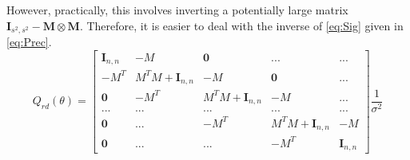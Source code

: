 \documentclass[11pt]{isuthesis}
\begin{document}
However, practically, this involves inverting a potentially large matrix $\boldsymbol{I}_{s^2,s^2}-\boldsymbol{M}\otimes\boldsymbol{M}$.  Therefore, it is easier to deal with the inverse of \eqref{eq:Sig} given in \eqref{eq:Prec}.
\begin{equation}
Q_{rd}(\theta)=
\left[
\begin{array}{c|c|c|c|c}
\boldsymbol{I}_{n,n} & -M & \boldsymbol{0}&  ... & ... \\
\hline
- M^T  & M^T M +\boldsymbol{I}_{n,n} & - M & \boldsymbol{0} & ... \\
\hline
\boldsymbol{0} &- M^T  & M^T M +\boldsymbol{I}_{n,n} & - M & ...\\
\hline
...&...&...&...&...\\
\hline
\boldsymbol{0} & ... & - M^T  & M^T M +\boldsymbol{I}_{n,n} & - M\\
\hline
\boldsymbol{0} & ... & ... & -M^T & \boldsymbol{I}_{n,n}
\end{array} 
\right] \frac{1}{\sigma^2}\label{eq:Prec}
\end{equation}
\end{document}
